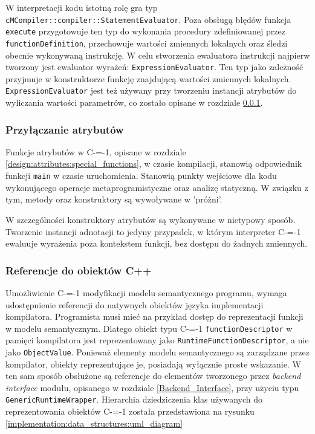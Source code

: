 W interpretacji kodu istotną rolę gra typ \lstinline{cMCompiler::compiler::StatementEvaluator}.
Poza obsługą błędów funkcja \lstinline{execute} przygotowuje ten typ do wykonania procedury zdefiniowanej przez \lstinline{functionDefinition}, przechowuje wartości zmiennych lokalnych oraz śledzi obecnie wykonywaną instrukcję.
W celu stworzenia ewaluatora instrukcji najpierw tworzony jest ewaluator wyrażeń: \lstinline{ExpressionEvaluator}.
Ten typ jako zależność przyjmuje w konstruktorze funkcję znajdującą wartości zmiennych lokalnych.
\lstinline{ExpressionEvaluator} jest też używany przy tworzeniu instancji atrybutów do wyliczania wartości parametrów, co zostało opisane w rozdziale \ref{implementation:interpreter:attribute_attachment}.


\subsubsection{Przyłączanie atrybutów}
\label{implementation:interpreter:attribute_attachment}

Funkcje atrybutów w C-=-1, opisane w rozdziale \ref{design:attributes:special_functions}, w czasie kompilacji, stanowią odpowiednik funkcji \lstinline{main} w czasie uruchomienia.
Stanowią punkty wejściowe dla kodu wykonującego operacje metaprogramistyczne oraz analizę statyczną.
W związku z tym, metody oraz konstruktory są wywoływane w 'próżni'.

W szczególności konstruktory atrybutów są wykonywane w nietypowy sposób.
Tworzenie instancji adnotacji to jedyny przypadek, w którym interpreter C-=-1 ewaluuje wyrażenia poza kontekstem funkcji, bez dostępu do żadnych zmiennych.


\subsubsection{Referencje do obiektów C++}
\label{implementation:interpreter:cpp_object_references}

Umożliwienie C-=-1 modyfikacji modelu semantycznego programu, wymaga udostępnienie referencji do natywnych obiektów języka implementacji kompilatora. %
Programista musi mieć na przykład dostęp do reprezentacji funkcji w modelu semantycznym.
Dlatego obiekt typu C-=-1 \lstinline{functionDescriptor} w pamięci kompilatora jest reprezentowany jako \lstinline{RuntimeFunctionDescriptor}, a nie jako \lstinline{ObjectValue}.
Ponieważ elementy modelu semantycznego są zarządzane przez kompilator, obiekty reprezentujące je, posiadają wyłącznie proste wskazanie.
W ten sam sposób obsłużone są referencje do elementów tworzonego przez \emph{backend interface} modułu, opisanego w rozdziale \ref{Backend_Interface}, przy użyciu typu \lstinline{GenericRuntimeWrapper}.
Hierarchia dziedziczenia klas używanych do reprezentowania obiektów C-=-1 została przedstawiona na rysunku \ref{implementation:data_structures:uml_diagram}

